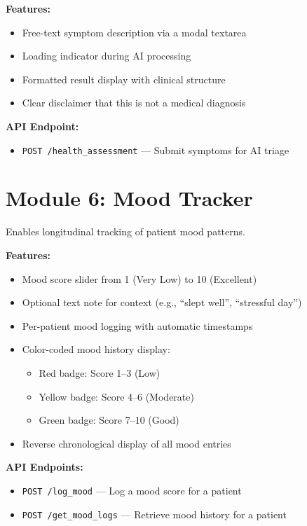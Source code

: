 \documentclass[12pt,a4paper]{report}
\begin{document}
\textbf{Features:}
\begin{itemize}
    \item Free-text symptom description via a modal textarea
    \item Loading indicator during AI processing
    \item Formatted result display with clinical structure
    \item Clear disclaimer that this is not a medical diagnosis
\end{itemize}

\textbf{API Endpoint:}
\begin{itemize}
    \item \texttt{POST /health\_assessment} --- Submit symptoms for AI triage
\end{itemize}

\section{Module 6: Mood Tracker}

Enables longitudinal tracking of patient mood patterns.

\textbf{Features:}
\begin{itemize}
    \item Mood score slider from 1 (Very Low) to 10 (Excellent)
    \item Optional text note for context (e.g., ``slept well'', ``stressful day'')
    \item Per-patient mood logging with automatic timestamps
    \item Color-coded mood history display:
    \begin{itemize}
        \item Red badge: Score 1--3 (Low)
        \item Yellow badge: Score 4--6 (Moderate)
        \item Green badge: Score 7--10 (Good)
    \end{itemize}
    \item Reverse chronological display of all mood entries
\end{itemize}

\textbf{API Endpoints:}
\begin{itemize}
    \item \texttt{POST /log\_mood} --- Log a mood score for a patient
    \item \texttt{POST /get\_mood\_logs} --- Retrieve mood history for a patient
\end{itemize}
\end{document}
